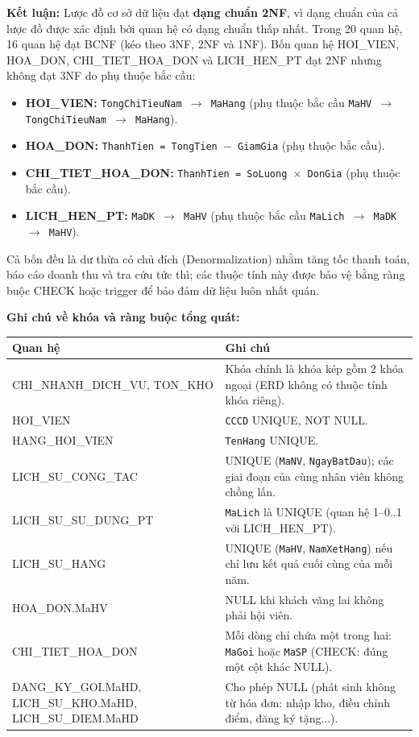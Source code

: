 \documentclass[11pt, a4paper]{article}
\begin{document}
\vspace{0.5em}
\textbf{Kết luận:} Lược đồ cơ sở dữ liệu đạt \textbf{dạng chuẩn 2NF}, vì dạng chuẩn của cả lược đồ được xác định bởi quan hệ có dạng chuẩn thấp nhất. Trong 20 quan hệ, 16 quan hệ đạt BCNF (kéo theo 3NF, 2NF và 1NF). Bốn quan hệ HOI\_VIEN, HOA\_DON, CHI\_TIET\_HOA\_DON và LICH\_HEN\_PT đạt 2NF nhưng không đạt 3NF do phụ thuộc bắc cầu:
\begin{itemize}
    \item \textbf{HOI\_VIEN:} \texttt{TongChiTieuNam $\rightarrow$ MaHang} (phụ thuộc bắc cầu \texttt{MaHV $\rightarrow$ TongChiTieuNam $\rightarrow$ MaHang}).
    \item \textbf{HOA\_DON:} \texttt{ThanhTien = TongTien $-$ GiamGia} (phụ thuộc bắc cầu).
    \item \textbf{CHI\_TIET\_HOA\_DON:} \texttt{ThanhTien = SoLuong $\times$ DonGia} (phụ thuộc bắc cầu).
    \item \textbf{LICH\_HEN\_PT:} \texttt{MaDK $\rightarrow$ MaHV} (phụ thuộc bắc cầu \texttt{MaLich $\rightarrow$ MaDK $\rightarrow$ MaHV}).
\end{itemize}
Cả bốn đều là dư thừa có chủ đích (Denormalization) nhằm tăng tốc thanh toán, báo cáo doanh thu và tra cứu tức thì; các thuộc tính này được bảo vệ bằng ràng buộc CHECK hoặc trigger để bảo đảm dữ liệu luôn nhất quán.

\vspace{0.5em}
\textbf{Ghi chú về khóa và ràng buộc tổng quát:}

\vspace{0.3em}
\begin{small}
\begin{tabularx}{\textwidth}{| C{5cm} | Y |}
\hline
\textbf{Quan hệ} & \textbf{Ghi chú} \\
\hline
CHI\_NHANH\_DICH\_VU, TON\_KHO & Khóa chính là khóa kép gồm 2 khóa ngoại (ERD không có thuộc tính khóa riêng). \\
\hline
HOI\_VIEN & \texttt{CCCD} UNIQUE, NOT NULL. \\
\hline
HANG\_HOI\_VIEN & \texttt{TenHang} UNIQUE. \\
\hline
LICH\_SU\_CONG\_TAC & UNIQUE (\texttt{MaNV}, \texttt{NgayBatDau}); các giai đoạn của cùng nhân viên không chồng lấn. \\
\hline
LICH\_SU\_SU\_DUNG\_PT & \texttt{MaLich} là UNIQUE (quan hệ 1--0..1 với LICH\_HEN\_PT). \\
\hline
LICH\_SU\_HANG & UNIQUE (\texttt{MaHV}, \texttt{NamXetHang}) nếu chỉ lưu kết quả cuối cùng của mỗi năm. \\
\hline
HOA\_DON.MaHV & NULL khi khách vãng lai không phải hội viên. \\
\hline
CHI\_TIET\_HOA\_DON & Mỗi dòng chỉ chứa một trong hai: \texttt{MaGoi} hoặc \texttt{MaSP} (CHECK: đúng một cột khác NULL). \\
\hline
DANG\_KY\_GOI.MaHD, LICH\_SU\_KHO.MaHD, LICH\_SU\_DIEM.MaHD & Cho phép NULL (phát sinh không từ hóa đơn: nhập kho, điều chỉnh điểm, đăng ký tặng...). \\
\hline
\end{tabularx}
\end{small}
\end{document}
